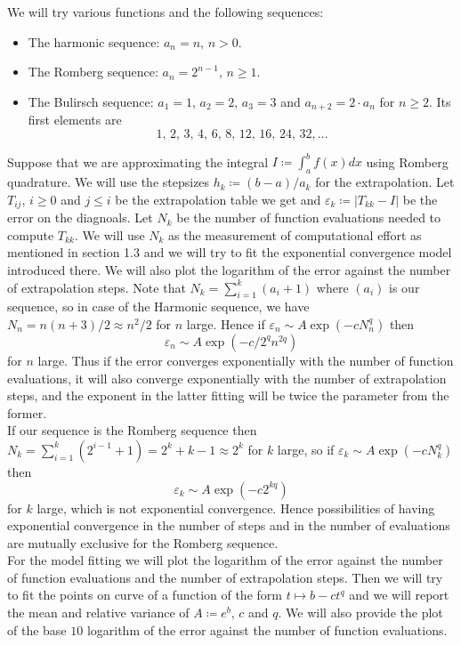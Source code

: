 We will try various functions and the following sequences:
\begin{itemize}
    \item The harmonic sequence: \(a_n = n\), \(n > 0\).
    \item The Romberg sequence: \(a_n = 2^{n-1}\), \(n\geq 1\).
    \item The Bulirsch sequence: \(a_1 = 1\), \(a_2 = 2\), \(a_3 = 3\) and \(a_{n+2} = 2\cdot a_n\) for \(n\geq 2\). Its first elements are 
    \[
    1,\, 2,\, 3,\, 4,\, 6,\, 8,\, 12,\, 16,\, 24,\, 32,\ldots
    \]
\end{itemize}

Suppose that we are approximating the integral \(I\coloneqq \int_a^b f(x)dx\) using Romberg quadrature. We will use the stepsizes \(h_k\coloneqq (b-a)/a_k\) for the extrapolation. Let \(T_{ij}\), \(i\geq 0\) and \(j\leq i\) be the extrapolation table we get and \(\varepsilon_k \coloneqq |T_{kk}-I|\) be the error on the diagnoals. Let \(N_k\) be the number of function evaluations needed to compute \(T_{kk}\). We will use \(N_k\) as the measurement of computational effort as mentioned in section 1.3 and we will try to fit the exponential convergence model introduced there. We will also plot the logarithm of the error against the number of extrapolation steps. Note that \(N_k = \sum_{i=1}^k(a_i + 1)\) where \((a_i)\) is our sequence, so in case of the Harmonic sequence, we have \(N_n = n(n+3)/2 \approx n^2/2\) for \(n\) large. Hence if \(\varepsilon_n \sim A\exp(-cN_n^q)\) then 
\[
\varepsilon_n \sim A\exp(-c/2^qn^{2q})
\]
for \(n\) large. Thus if the error converges exponentially with the number of function evaluations, it will also converge exponentially with the number of extrapolation steps, and the exponent in the latter fitting will be twice the parameter from the former.\\

If our sequence is the Romberg sequence then \(N_k = \sum_{i=1}^k (2^{i-1} + 1) = 2^k + k - 1 \approx 2^k\) for \(k\) large, so if \(\varepsilon_k\sim A \exp(-cN_k^q)\) then 
\[
\varepsilon_k \sim A\exp(-c 2^{kq}) 
\]
for \(k\) large, which is not exponential convergence. Hence possibilities of having exponential convergence in the number of steps and in the number of evaluations are mutually exclusive for the Romberg sequence.\\

For the model fitting we will plot the logarithm of the error against the number of function evaluations  and the number of extrapolation steps. Then we will try to fit the points on curve of a function of the form \(t\mapsto b - ct^q\) and we will report the mean and relative variance of \(A\coloneqq e^b\), \(c\) and \(q\). We will also provide the plot of the base \(10\) logarithm of the error against the number of function evaluations. \\

